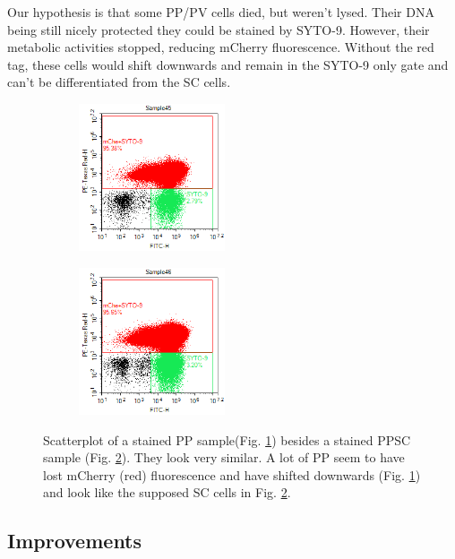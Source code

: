 \documentclass[a4paper, 10pt, conference]{ieeeconf}   %
\begin{document}
Our hypothesis is that some PP/PV cells died, but weren’t lysed. Their DNA being still nicely protected they could be stained by SYTO-9. However, their metabolic activities stopped, reducing mCherry fluorescence. Without the red tag, these cells would shift downwards and remain in the SYTO-9 only gate and can't be differentiated from the SC cells.
\begin{figure}
	\hspace{-0.3cm}
	\begin{subfigure}{.25\textwidth}
		\centering
		\includegraphics[width=4.3cm]{PP3T5.png}
		\caption{}
		\label{problemflow1}
	\end{subfigure}%
	\begin{subfigure}{.22\textwidth}
		\centering		
		\includegraphics[width=4.3cm]{PPSC1T5.png}
		\caption{}
		\label{problemflow2}				
	\end{subfigure}
\caption{Scatterplot of a stained PP sample(Fig. \ref{problemflow1}) besides a stained PPSC sample (Fig. \ref{problemflow2}). They look very similar. A lot of PP seem to have lost mCherry (red) fluorescence and have shifted downwards (Fig. \ref{problemflow1}) and look like the supposed SC cells in Fig. \ref{problemflow2}.  }
\label{problemflow}
\end{figure}	

\subsection{Improvements}
\end{document}
